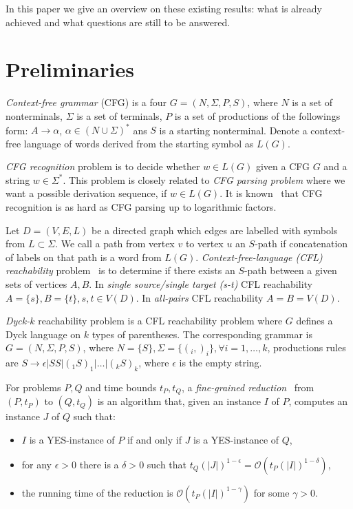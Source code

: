 \documentclass[acmsmall,review,nonacm]{acmart}\settopmatter{printfolios=true,printccs=false,printacmref=false}
\begin{document}
	In this paper we give an overview on these existing results: what is already achieved and what questions are still to be answered.
	
	\section{Preliminaries}
	
	\emph{Context-free grammar} (CFG) is a four $G=(N, \Sigma, P, S)$, where $N$ is a set of nonterminals, $\Sigma$ is a set of terminals, $P$ is a set of productions of the followings form: $A \to \alpha$, $\alpha \in (N \cup \Sigma)^*$ ans $S$ is a starting nonterminal. Denote a context-free language of words derived from the starting symbol as $L(G)$.
	
	\emph{CFG recognition} problem is to decide whether $w \in L(G)$ given a CFG $G$ and a string $w \in \Sigma^*$. This problem is closely related to \emph{CFG parsing problem} where we want a possible derivation sequence, if $w \in L(G)$. It is known~\cite{10.5555/646233.682379} that CFG recognition is as hard as CFG parsing up to logarithmic factors.
		
	Let $D = (V, E, L)$ be a directed graph which edges are labelled with symbols from $L \subset \Sigma$. We call a path from vertex $v$ to vertex $u$ an $S$-path if concatenation of labels on that path is a word from $L(G)$.  \emph{Context-free-language (CFL) reachability} problem~\cite{10.1145/258994.259006} is to determine if there exists an $S$-path between a given sets of vertices $A, B$. In \emph{single source/single target (s-t)} CFL reachability $A = \{s\}, B = \{t\}, s, t \in V(D)$. In \emph{all-pairs} CFL reachability $A = B = V(D)$.
	
	\emph{Dyck-$k$} reachability problem is a CFL reachability problem where $G$ defines a Dyck language on $k$ types of parentheses. The corresponding grammar is $G=(N, \Sigma, P, S)$, where $N = \{S\}, \Sigma = \{(_i, )_i\}, \forall i = 1, \ldots, k$, productions rules are $S \rightarrow \epsilon | SS | (_1 S )_1 | \ldots | (_k S )_k$, where $\epsilon$ is the empty string. 
	
	For problems $P, Q$ and time bounds $t_P, t_Q$, a \emph{fine-grained reduction}~\cite{bringmann2019fine} from $(P, t_P)$ to $(Q, t_Q)$ is an algorithm that, given an instance $I$ of $P$, computes an instance $J$ of $Q$ such that: 
	
	\begin{itemize}
		\item $I$ is a YES-instance of $P$ if and only if $J$ is a YES-instance of $Q$,
		\item for any $\epsilon > 0$ there is a $\delta > 0$ such that $t_Q(|J|)^{1 - \epsilon} = \mathcal{O}(t_P (|I|)^{1 - \delta})$, 
		\item the running time of the reduction is $\mathcal{O}(t_P (|I|)^{1 - \gamma})$ for some $\gamma > 0$.
	\end{itemize}
\end{document}
